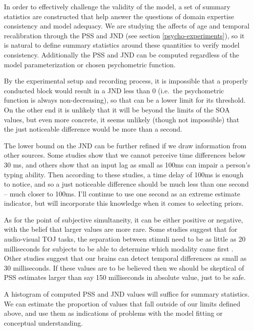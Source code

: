 \documentclass[11pt, oneside, openany]{scrbook}
\begin{document}
In order to effectively challenge the validity of the model, a set of summary statistics are constructed that help answer the questions of domain expertise consistency and model adequacy. We are studying the affects of age and temporal recalibration through the PSS and JND (see section \ref{psycho-experiments}), so it is natural to define summary statistics around these quantities to verify model consistency. Additionally the PSS and JND can be computed regardless of the model parameterization or chosen psychometric function.

By the experimental setup and recording process, it is impossible that a properly conducted block would result in a JND less than 0 (i.e.~the psychometric function is always non-decreasing), so that can be a lower limit for its threshold. On the other end it is unlikely that it will be beyond the limits of the SOA values, but even more concrete, it seems unlikely (though not impossible) that the just noticeable difference would be more than a second.

The lower bound on the JND can be further refined if we draw information from other sources. Some studies show that we cannot perceive time differences below 30 ms, and others show that an input lag as small as 100ms can impair a person's typing ability. Then according to these studies, a time delay of 100ms is enough to notice, and so a just noticeable difference should be much less than one second -- much closer to 100ms. I'll continue to use one second as an extreme estimate indicator, but will incorporate this knowledge when it comes to selecting priors.

As for the point of subjective simultaneity, it can be either positive or negative, with the belief that larger values are more rare. Some studies suggest that for audio-visual TOJ tasks, the separation between stimuli need to be as little as 20 milliseconds for subjects to be able to determine which modality came first \citep{vatakis2007influence}. Other studies suggest that our brains can detect temporal differences as small as 30 milliseconds. If these values are to be believed then we should be skeptical of PSS estimates larger than say 150 milliseconds in absolute value, just to be safe.

A histogram of computed PSS and JND values will suffice for summary statistics. We can estimate the proportion of values that fall outside of our limits defined above, and use them as indications of problems with the model fitting or conceptual understanding.
\end{document}
